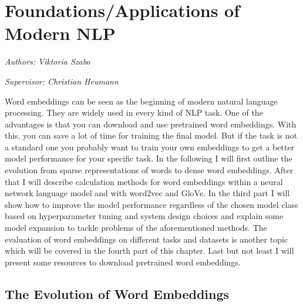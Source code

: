 \documentclass[]{krantz}
\begin{document}
\hypertarget{foundationsapplications-of-modern-nlp}{%
\chapter{Foundations/Applications of Modern NLP}\label{foundationsapplications-of-modern-nlp}}

\emph{Authors: Viktoria Szabo}

\emph{Supervisor: Christian Heumann}

Word embeddings can be seen as the beginning of modern natural language processing. They are widely used in every kind of NLP task. One of the advantages is that you can download and use pretrained word embeddings. With this, you can save a lot of time for training the final model. But if the task is not a standard one you probably want to train your own embeddings to get a better model performance for your specific task. In the following I will first outline the evolution from sparse representations of words to dense word embeddings. After that I will describe calculation methods for word embeddings within a neural network language model and with word2vec and GloVe. In the third part I will show how to improve the model performance regardless of the chosen model class based on hyperparameter tuning and system design choices and explain some model expansion to tackle problems of the aforementioned methods. The evaluation of word embeddings on different tasks and datasets is another topic which will be covered in the fourth part of this chapter. Last but not least I will present some resources to download pretrained word embeddings.

\hypertarget{the-evolution-of-word-embeddings}{%
\section{The Evolution of Word Embeddings}\label{the-evolution-of-word-embeddings}}
\end{document}

